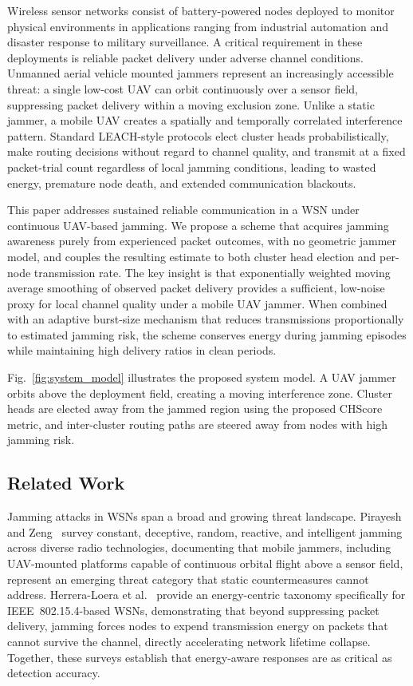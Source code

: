 \documentclass[conference]{IEEEtran}
\begin{document}
Wireless sensor networks consist of battery-powered nodes deployed
to monitor physical environments in applications ranging from
industrial automation and disaster response to military surveillance.
A critical requirement in these deployments is reliable packet delivery
under adverse channel conditions. Unmanned aerial vehicle mounted
jammers represent an increasingly accessible threat: a single low-cost
UAV can orbit continuously over a sensor field, suppressing packet
delivery within a moving exclusion zone. Unlike a static jammer, a
mobile UAV creates a spatially and temporally correlated interference
pattern. Standard LEACH-style protocols elect cluster heads
probabilistically, make routing decisions without regard to channel
quality, and transmit at a fixed packet-trial count regardless of local jamming
conditions, leading to wasted energy, premature node death, and
extended communication blackouts.

This paper addresses sustained reliable communication in a WSN under
continuous UAV-based jamming. We propose a scheme that acquires jamming
awareness purely from experienced packet outcomes, with no geometric
jammer model, and couples the resulting estimate to both cluster head
election and per-node transmission rate. The key insight is that
exponentially weighted moving average smoothing of observed packet
delivery provides a sufficient, low-noise proxy for local channel
quality under a mobile UAV jammer. When combined with an adaptive
burst-size mechanism that reduces transmissions proportionally to
estimated jamming risk, the scheme conserves energy during jamming
episodes while maintaining high delivery ratios in clean periods.

Fig.~\ref{fig:system_model} illustrates the proposed system model.
A UAV jammer orbits above the deployment field, creating a moving
interference zone. Cluster heads are elected away from the jammed
region using the proposed CHScore metric, and inter-cluster routing
paths are steered away from nodes with high jamming risk.

\subsection{Related Work}

Jamming attacks in WSNs span a broad and growing threat landscape.
Pirayesh and Zeng~\cite{Pirayesh2022} survey constant, deceptive,
random, reactive, and intelligent jamming across diverse radio
technologies, documenting that mobile jammers, including UAV-mounted
platforms capable of continuous orbital flight above a sensor
field, represent an emerging threat category that static
countermeasures cannot address. Herrera-Loera et al.~\cite{Herrera2026}
provide an energy-centric taxonomy specifically for
IEEE~802.15.4-based WSNs, demonstrating that beyond suppressing packet
delivery, jamming forces nodes to expend transmission energy on packets
that cannot survive the channel, directly accelerating network lifetime
collapse. Together, these surveys establish that energy-aware responses
are as critical as detection accuracy.
\end{document}
